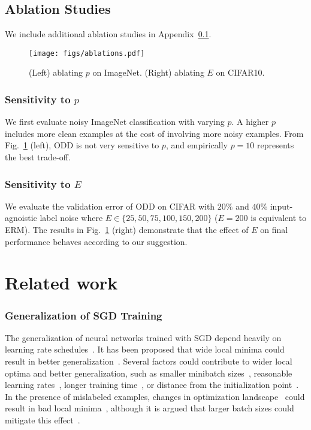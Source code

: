 \documentclass[a4paper,11pt]{article}
\begin{document}
\subsection{Ablation Studies}
\label{sec:exp-ablation}



We include additional ablation studies in Appendix~\ref{sec:exp-ablation}.

\begin{figure}
    \centering
    \texttt{[image: figs/ablations.pdf]}
    \caption{(Left) ablating $p$ on ImageNet. (Right) ablating $E$ on CIFAR10.}
    \label{fig:ablations}
\end{figure}


\subsubsection{Sensitivity to $p$} We first evaluate noisy ImageNet classification with varying $p$. A higher $p$ includes more clean examples at the cost of involving more noisy examples. 
From Fig.~\ref{fig:ablations} (left), \textsc{ODD} is not very sensitive to $p$, and empirically $p = 10$ represents the best trade-off. 


\subsubsection{Sensitivity to $E$} We evaluate the validation error of \textsc{ODD} on CIFAR with $20\%$ and $40\%$ input-agnoistic label noise where $E \in \{25, 50, 75, 100, 150, 200\}$ ($E = 200$ is equivalent to \textsc{ERM}). The results in Fig.~\ref{fig:ablations} (right) demonstrate that the effect of $E$ on final performance behaves according to our suggestion. 













%
 \section{Related work}
\subsubsection{Generalization of SGD Training} The generalization of neural networks trained with SGD depend heavily on learning rate schedules~\cite{loshchilov2016sgdr}. It has been proposed that wide local minima could result in better generalization~\cite{hochreiter1995simplifying,chaudhari2016entropy,keskar2016on}. Several factors could contribute to wider local optima and better generalization, such as smaller minibatch sizes~\cite{keskar2016on}, reasonable learning rates~\cite{kleinberg2018an}, longer training time~\cite{hoffer2017train}, or distance from the initialization point~\cite{hoffer2017train}. 
In the presence of mislabeled examples, changes in optimization landscape~\cite{arpit2017a} could result in bad local minima~\cite{zhang2016understanding}, although it is argued that larger batch sizes could mitigate this effect~\cite{rolnick2017deep}.
\end{document}

